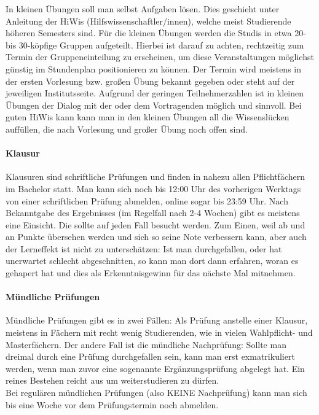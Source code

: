 	In kleinen Übungen soll man selbst Aufgaben lösen. Dies geschieht unter Anleitung der HiWis (Hilfswissenschaftler/innen), welche meist Studierende höheren Semesters sind. Für die kleinen Übungen werden die Studis in etwa 20- bis 30-köpfige Gruppen aufgeteilt. Hierbei ist darauf zu achten, rechtzeitig zum Termin der Gruppeneinteilung zu erscheinen, um diese Veranstaltungen möglichst günstig im Stundenplan positionieren zu können. Der Termin wird meistens in der ersten Vorlesung bzw. großen Übung bekannt gegeben oder steht auf der jeweiligen Institutsseite. Aufgrund der geringen Teilnehmerzahlen ist in kleinen Übungen der Dialog mit der oder dem Vortragenden möglich und sinnvoll. Bei guten HiWis kann kann man in den kleinen Übungen all die Wissenslücken auffüllen, die nach Vorlesung und großer Übung noch offen sind.
	
	\paragraph*{Klausur}
	Klausuren sind schriftliche Prüfungen und finden in nahezu allen Pflichtfächern im Bachelor statt. Man kann sich noch bis 12:00 Uhr des vorherigen Werktags von einer schriftlichen Prüfung abmelden, online sogar bis 23:59 Uhr. Nach Bekanntgabe des Ergebnisses (im Regelfall nach 2-4 Wochen) gibt es meistens eine Einsicht. Die sollte auf jeden Fall besucht werden. Zum Einen, weil ab und an Punkte übersehen werden und sich so seine Note verbessern kann, aber auch der Lerneffekt ist nicht zu unterschätzen: Ist man durchgefallen, oder hat unerwartet schlecht abgeschnitten, so kann man dort dann erfahren, woran es gehapert hat und dies als Erkenntnisgewinn für das nächste Mal mitnehmen.

	\paragraph*{Mündliche Prüfungen}
	Mündliche Prüfungen gibt es in zwei Fällen: Als Prüfung anstelle einer Klausur, meistens in Fächern mit recht wenig Studierenden, wie in vielen Wahlpflicht- und Masterfächern. 
	Der andere Fall ist die mündliche Nachprüfung: Sollte man dreimal durch eine Prüfung durchgefallen sein, kann man erst exmatrikuliert werden, wenn man zuvor eine sogenannte Ergänzungsprüfung abgelegt hat. Ein reines Bestehen reicht aus um weiterstudieren zu dürfen.\\
	Bei regulären mündlichen Prüfungen (also KEINE Nachprüfung) kann man sich bis eine Woche vor dem Prüfungstermin noch abmelden.

